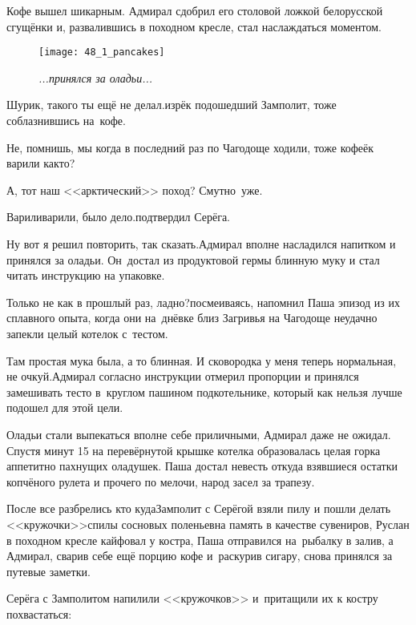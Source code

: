 Кофе вышел шикарным. Адмирал сдобрил его столовой ложкой белорусской сгущёнки и, развалившись в походном кресле, стал наслаждаться моментом.

\newpage

\begin{wrapfigure}[20]{r}{0.58\textwidth}
	\centering
	\texttt{[image: 48\_1\_pancakes]}
	\caption{\small\textit{...принялся за оладьи...}}
\end{wrapfigure}
\diagdash Шурик, такого ты ещё не делал.\mdash изрёк подошедший Замполит, тоже соблазнившись на~кофе.

\diagdash Не, помнишь, мы когда в последний раз по Чагодоще ходили, тоже кофеёк варили как\sdash то?

\diagdash А, тот наш <<арктический>> поход? Смутно~уже.

\diagdash Варили\sdash варили, было дело.\mdash подтвердил Серёга.

\diagdash Ну вот я решил повторить, так сказать.\mdash Адмирал вполне насладился напитком и принялся за оладьи. Он~достал из продуктовой гермы блинную муку и стал читать инструкцию на упаковке.

\diagdash Только не как в прошлый раз, ладно?\mdash посмеиваясь, напомнил Паша эпизод из их сплавного опыта, когда они на~днёвке близ Загривья на Чагодоще неудачно запекли целый котелок с~тестом.

\diagdash Там простая мука была, а то блинная. И сковородка у меня теперь нормальная, не очкуй.\mdash Адмирал согласно инструкции отмерил пропорции и принялся замешивать тесто в~круглом пашином подкотельнике, который как нельзя лучше подошел для этой цели.

Оладьи стали выпекаться вполне себе приличными, Адмирал даже не ожидал. Спустя минут 15 на перевёрнутой крышке котелка образовалась целая горка аппетитно пахнущих оладушек. Паша достал невесть откуда взявшиеся остатки копчёного рулета и прочего по мелочи, народ засел за трапезу.

После все разбрелись кто куда\mdash Замполит с Серёгой взяли пилу и пошли делать <<кружочки>>\mdash спилы сосновых поленьев\mdash на память в качестве сувениров, Руслан в походном кресле кайфовал у костра, Паша отправился на~рыбалку в залив, а Адмирал, сварив себе ещё порцию кофе и~раскурив сигару, снова принялся за путевые заметки.

Серёга с Замполитом напилили <<кружочков>> и~притащили их к костру похвастаться:

